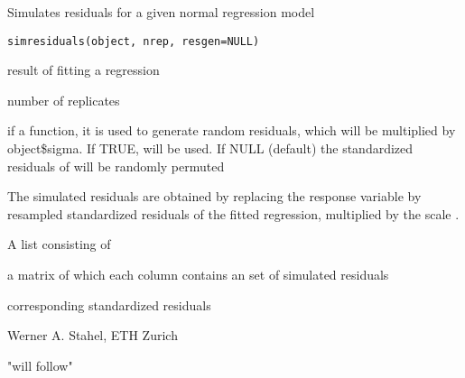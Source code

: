\documentclass{article}
\begin{document}
\begin{Description}\relax
Simulates residuals for a given normal regression model
\end{Description}
\begin{Usage}
\begin{verbatim}
simresiduals(object, nrep, resgen=NULL)
\end{verbatim}
\end{Usage}
\begin{Arguments}
\begin{ldescription}
\item[\code{object}] result of fitting a regression
\item[\code{nrep}] number of replicates
\item[\code{resgen}] if a function, it is used to generate random residuals,
which will be multiplied by object\$sigma. If TRUE,  will
be used. If NULL (default) the standardized residuals of
 will be randomly permuted
\end{ldescription}
\end{Arguments}
\begin{Details}\relax
The simulated residuals are obtained by replacing the response
variable by resampled standardized residuals of the fitted regression,
multiplied by the scale .
\end{Details}
\begin{Value}
A list consisting of
\begin{ldescription}
\item[\code{simres}] a matrix of which each column contains an set of
simulated residuals
\item[\code{simstres}] corresponding standardized residuals
\end{ldescription}
\end{Value}
\begin{Author}\relax
Werner A. Stahel, ETH Zurich
\end{Author}
\begin{Examples}
\begin{ExampleCode}
"will follow"
\end{ExampleCode}
\end{Examples}
\end{document}
